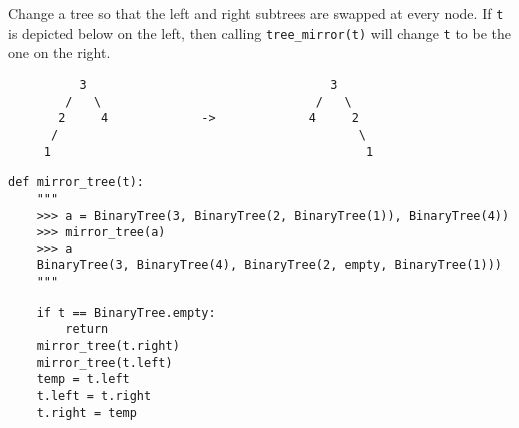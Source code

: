 Change a tree so that the left and right subtrees are swapped at every node.
If \texttt{t} is depicted below on the left, then calling
\texttt{tree\_mirror(t)} will change \texttt{t} to be the one on the
right.

\begin{center}
\begin{lstlisting}
          3                                  3
        /   \                              /   \
       2     4             ->             4     2
      /                                          \
     1                                            1

\end{lstlisting}
\end{center}

\begin{lstlisting}
def mirror_tree(t):
    """
    >>> a = BinaryTree(3, BinaryTree(2, BinaryTree(1)), BinaryTree(4))
    >>> mirror_tree(a)
    >>> a
    BinaryTree(3, BinaryTree(4), BinaryTree(2, empty, BinaryTree(1)))
    """
\end{lstlisting}
\begin{solution}[1.25in]
\begin{lstlisting}
    if t == BinaryTree.empty:
        return
    mirror_tree(t.right)
    mirror_tree(t.left)
    temp = t.left
    t.left = t.right
    t.right = temp
\end{lstlisting}
\end{solution}
